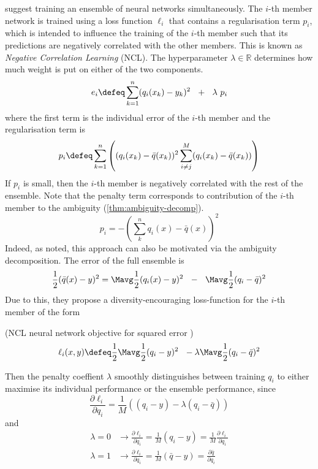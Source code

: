 \documentclass[../main.tex]{subfiles}
\begin{document}
\cite{LiuYao} suggest training an ensemble of neural networks simultaneously. The $i$-th member network is trained using a loss function $\ell_{i}$ that contains a regularisation term $p_{i}$, which is intended to influence the training of the $i$-th member such that its predictions are negatively correlated with the other members. This is known as \textit{Negative Correlation Learning} (NCL). The hyperparameter $\lambda \in \mathbb{R}$ determines how much weight is put on either of the two components.
$$
e_{i} \defeq
\sum_{k=1}^n (q_{i}(x_{k}) - y_{k})^2 ~ ~ + ~ ~ \lambda ~ p_{i}
$$
where the first term is the individual error of the $i$-th member and the regularisation term is
$$
p_{i} \defeq \sum_{k=1}^n \left( 
(q_{i}(x_{k}) - \bar{q}(x_{k}))^2
\sum_{i \not=j}^M (q_{i}(x_{k}) - \bar{q}(x_{k}))
\right)
$$
If $p_{i}$ is small, then the $i$-th member is negatively correlated with the rest of the ensemble.
Note that the penalty term corresponds to contribution of the $i$-th member to the ambiguity (\ref{thm:ambiguity-decomp}).
$$
p_{i} = - \left(\sum_k^n q_{i}(x) - \bar{q}(x)\right)^2
$$
Indeed, as \cite{brown2005} noted, this approach can also be motivated via the ambiguity decomposition. The error of the full ensemble is 
$$
\frac{1}{2}(\bar{q}(x)-y)^2 = \Mavg \frac{1}{2}(q_{i}(x)-y)^2 ~ ~ - ~ ~ \Mavg \frac{1}{2}(q_{i} - \bar{q})^2
$$
Due to this, they propose a diversity-encouraging loss-function for the $i$-th member of the form
\begin{definition} (NCL neural network objective for squared error \cite{brown2005})
$$
\ell_{i}(x,y) \defeq \frac{1}{2} \Mavg \frac{1}{2} (q_{i}-y)^2 ~ ~ - \lambda \Mavg \frac{1}{2} (q_{i} - \bar{q})^2
$$
\end{definition}
Then the penalty coeffient $\lambda$ smoothly distinguishes between training $q_{i}$ to either maximise its individual performance or the ensemble performance, since
$$
\frac{\partial\ell_{i}}{\partial q_{i}} = \frac{1}{M}
\left(
(q_{i}-y) - \lambda (q_{i} - \bar{q})
\right)
$$
and
$$
\begin{align}
\lambda = 0 &\rightarrow \frac{\partial\ell_{i}}{\partial q_{i}} = \frac{1}{M}(q_{i}-y) = \frac{1}{M} \frac{\partial\ell_{i}}{\partial q_{i}} \\
\lambda = 1 &\rightarrow \frac{\partial\ell_{i}}{\partial q_{i}} = \frac{1}{M}(\bar{q} - y) = \frac{\partial\bar{q}}{\partial q_{i}}
\end{align}
$$
\end{document}
